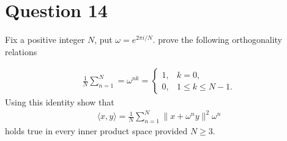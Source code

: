 \section{Question 14}
\horz
Fix a positive integer $N$, put $\omega= e ^{2\pi i/N}.$ prove the following orthogonality relations

\begin{align*}
\frac{1}{N} \sum\limits_{n=1}^N=\omega^{nk} = 
\begin{cases}
1, & k=0,\\
0, & 1\leqslant k \leqslant N-1.
\end{cases}
\end{align*}
Using this identity show that
\begin{align*}
\langle x,y\rangle = \frac{1}{N} \sum\limits_{n=1}^N \|x+\omega^n y\|^2 \omega^n
\end{align*} holds true in every inner product space provided $N\geqslant 3.$
\horz

